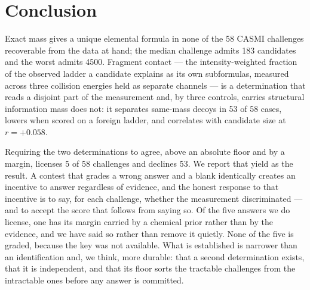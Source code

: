 \documentclass[11pt,twocolumn,a4paper]{article}
\theoremstyle{definition}
\theoremstyle{remark}
\begin{document}
\section{Conclusion}

Exact mass gives a unique elemental formula in none of the 58 CASMI challenges
recoverable from the data at hand; the median challenge admits 183 candidates and
the worst admits 4500. Fragment contact --- the intensity-weighted fraction of the
observed ladder a candidate explains as its own subformulas, measured across three
collision energies held as separate channels --- is a determination that reads a
disjoint part of the measurement and, by three controls, carries structural
information mass does not: it separates same-mass decoys in 53 of 58 cases, lowers
when scored on a foreign ladder, and correlates with candidate size at
$r = +0.058$.

Requiring the two determinations to agree, above an absolute floor and by a
margin, licenses 5 of 58 challenges and declines 53. We report that yield as the
result. A contest that grades a wrong answer and a blank identically creates an
incentive to answer regardless of evidence, and the honest response to that
incentive is to say, for each challenge, whether the measurement discriminated ---
and to accept the score that follows from saying so. Of the five answers we do
license, one has its margin carried by a chemical prior rather than by the
evidence, and we have said so rather than remove it quietly. None of the five is
graded, because the key was not available. What is established is narrower than an
identification and, we think, more durable: that a second determination exists, that
it is independent, and that its floor sorts the tractable challenges from the
intractable ones before any answer is committed.



\end{document}
